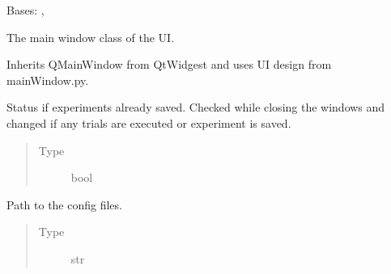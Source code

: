 \documentclass[letterpaper,10pt,english]{sphinxmanual}
\begin{document}
\begin{fulllineitems}
\label{\detokenize{NoSeMazeControl/main:main.MainApp}}
\pysigstartsignatures
{}
\pysigstopsignatures
\sphinxAtStartPar
Bases: , {\hyperref[\detokenize{NoSeMazeControl/Designs:Designs.mainWindow.Ui_MainWindow}]{}}

\sphinxAtStartPar
The main window class of the UI.

\sphinxAtStartPar
Inherits QMainWindow from QtWidgest and uses UI design from
mainWindow.py.

\begin{fulllineitems}
\label{\detokenize{NoSeMazeControl/main:main.MainApp.saved_status}}
\pysigstartsignatures
{}
\pysigstopsignatures
\sphinxAtStartPar
Status if experiments already saved. Checked while closing the windows
and changed if any trials are executed or experiment is saved.
\begin{quote}\begin{description}
\item[{Type}] \leavevmode
\sphinxAtStartPar
bool

\end{description}\end{quote}

\end{fulllineitems}


\begin{fulllineitems}
\label{\detokenize{NoSeMazeControl/main:main.MainApp.config_path}}
\pysigstartsignatures
{}
\pysigstopsignatures
\sphinxAtStartPar
Path to the config files.
\begin{quote}\begin{description}
\item[{Type}] \leavevmode
\sphinxAtStartPar
str

\end{description}\end{quote}


\end{fulllineitems}
\end{fulllineitems}
\end{document}
